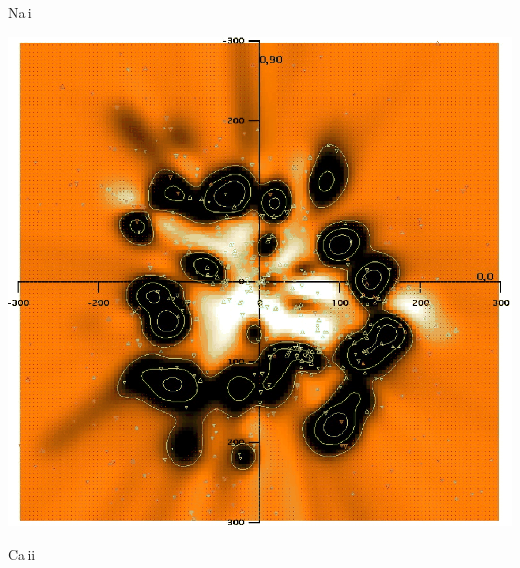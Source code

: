 {\begin{minipage}[t]{0.49\textwidth}
\begin{center}
Na\,{\sc i} 
\end{center}
\end{minipage}
\begin{minipage}[t]{0.49\textwidth}
\begin{center}
\includegraphics[width=\textwidth,height=!]{./A/welsh_fig15.png}

Ca\,{\sc ii}
\end{center}
\end{minipage}

}


